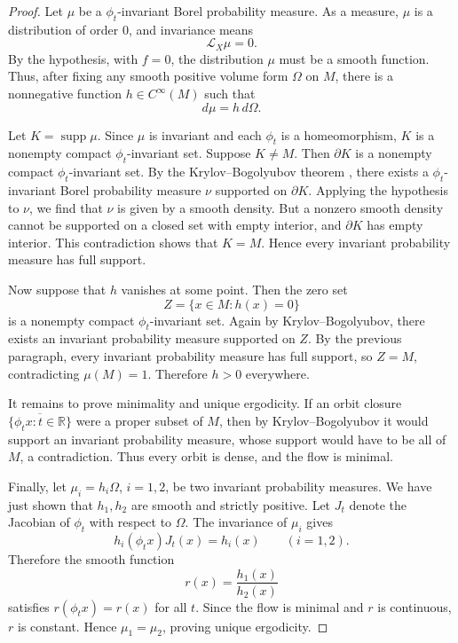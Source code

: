 \documentclass[11pt]{article}
\theoremstyle{definition}
\theoremstyle{remark}
\numberwithin{equation}{section}
\begin{document}
\begin{proof}
Let \(\mu\) be a \(\phi_t\)-invariant Borel probability measure. As a measure,
\(\mu\) is a distribution of order \(0\), and invariance means
\[
  \mathcal L_X\mu=0.
\]
By the hypothesis, with \(f=0\), the distribution \(\mu\) must be a smooth
function. Thus, after fixing any smooth positive volume form \(\Omega\) on \(M\),
there is a nonnegative function \(h\in C^\infty(M)\) such that
\[
  d\mu=h\,d\Omega.
\]

Let \(K=\operatorname{supp}\mu\). Since \(\mu\) is invariant and each \(\phi_t\) is a
homeomorphism, \(K\) is a nonempty compact \(\phi_t\)-invariant set. Suppose
\(K\neq M\). Then \(\partial K\) is a nonempty compact \(\phi_t\)-invariant set.
By the Krylov--Bogolyubov theorem \cite{walters}, there exists a
\(\phi_t\)-invariant Borel probability measure \(\nu\) supported on \(\partial K\).
Applying the hypothesis to \(\nu\), we find that \(\nu\) is given by a smooth
density. But a nonzero smooth density cannot be supported on a closed set with
empty interior, and \(\partial K\) has empty interior. This contradiction shows
that \(K=M\). Hence every invariant probability measure has full support.

Now suppose that \(h\) vanishes at some point. Then the zero set
\[
  Z=\{x\in M:h(x)=0\}
\]
is a nonempty compact \(\phi_t\)-invariant set. Again by Krylov--Bogolyubov,
there exists an invariant probability measure supported on \(Z\). By the previous
paragraph, every invariant probability measure has full support, so \(Z=M\),
contradicting \(\mu(M)=1\). Therefore \(h>0\) everywhere.

It remains to prove minimality and unique ergodicity. If an orbit closure
\(\overline{\{\phi_t x:t\in\mathbb R\}}\) were a proper subset of \(M\), then by
Krylov--Bogolyubov it would support an invariant probability measure, whose
support would have to be all of \(M\), a contradiction. Thus every orbit is
dense, and the flow is minimal.

Finally, let \(\mu_i=h_i\Omega\), \(i=1,2\), be two invariant probability
measures. We have just shown that \(h_1,h_2\) are smooth and strictly positive.
Let \(J_t\) denote the Jacobian of \(\phi_t\) with respect to \(\Omega\). The
invariance of \(\mu_i\) gives
\[
  h_i(\phi_t x)J_t(x)=h_i(x)
  \qquad (i=1,2).
\]
Therefore the smooth function
\[
  r(x)=\frac{h_1(x)}{h_2(x)}
\]
satisfies \(r(\phi_t x)=r(x)\) for all \(t\). Since the flow is minimal and \(r\)
is continuous, \(r\) is constant. Hence \(\mu_1=\mu_2\), proving unique
ergodicity.
\end{proof}
\end{document}
